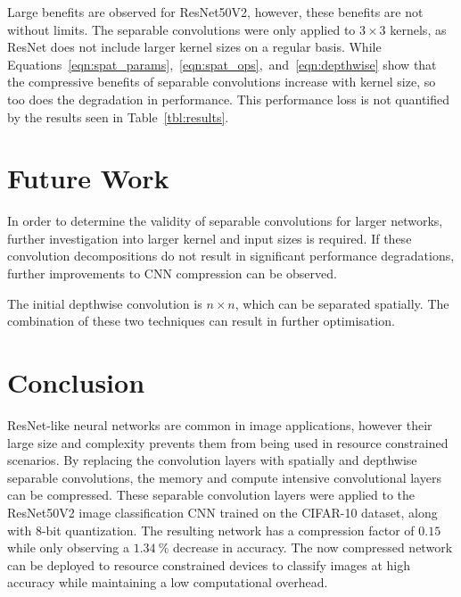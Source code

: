 \documentclass{article}
\begin{document}
	Large benefits are observed for ResNet50V2, however, these benefits are not without limits. The separable convolutions were only applied to $3 \times 3$ kernels, as ResNet does not include larger kernel sizes on a regular basis. While Equations~\ref{eqn:spat_params},~\ref{eqn:spat_ops},~and~\ref{eqn:depthwise} show that the compressive benefits of separable convolutions increase with kernel size, so too does the degradation in performance. This performance loss is not quantified by the results seen in Table~\ref{tbl:results}.
	
	\section{Future Work}
	
	In order to determine the validity of separable convolutions for larger networks, further investigation into larger kernel and input sizes is required. If these convolution decompositions do not result in significant performance degradations, further improvements to CNN compression can be observed.

	The initial depthwise convolution is $n \times n$, which can be separated spatially. The combination of these two techniques can result in further optimisation.
	
	
	\section{Conclusion}
	
	ResNet-like neural networks are common in image applications, however their large size and complexity prevents them from being used in resource constrained scenarios. By replacing the convolution layers with spatially and depthwise separable convolutions, the memory and compute intensive convolutional layers can be compressed. These separable convolution layers were applied to the ResNet50V2 image classification CNN trained on the CIFAR-10 dataset, along with 8-bit quantization. The resulting network has a compression factor of $0.15$ while only observing a $1.34~\%$ decrease in accuracy. The now compressed network can be deployed to resource constrained devices to classify images at high accuracy while maintaining a low computational overhead.
	
	\newpage
	
	
	
\end{document}
